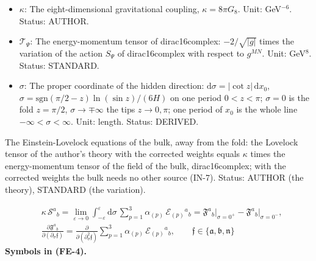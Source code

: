 \documentclass[
  10pt,
]{article}
\begin{document}
\begin{itemize}
  square matrix of the Kronecker deltas \(\delta^{M_a}_{N_b}\) (\(+1\)
  or \(-1\) if the upper indices are an even or odd permutation of the
  lower ones, 0 otherwise). Status: STANDARD.
\item
  \(\kappa\): The eight-dimensional gravitational coupling,
  \(\kappa = 8\pi G_8\). Unit: GeV\(^{-6}\). Status: AUTHOR.
\item
  \(\mathcal{T}_\Psi\): The energy-momentum tensor of dirac16complex:
  \(-2/\sqrt{\lvert g\rvert}\) times the variation of the action
  \(S_\Psi\) of dirac16complex with respect to \(g^{MN}\). Unit:
  GeV\(^8\). Status: STANDARD.
\item
  \(\sigma\): The proper coordinate of the hidden direction:
  \(\mathrm{d}\sigma = \lvert\cot z\rvert\,\mathrm{d}x_0\),
  \(\sigma = \mathrm{sgn}(\pi/2 - z)\ln(\sin z)/(6H)\) on one period
  \(0 < z < \pi\); \(\sigma = 0\) is the fold \(z = \pi/2\),
  \(\sigma \to \mp\infty\) the tips \(z \to 0, \pi\); one period of
  \(x_0\) is the whole line \(-\infty < \sigma < \infty\). Unit: length.
  Status: DERIVED.
\end{itemize}

The Einstein-Lovelock equations of the bulk, away from the fold: the
Lovelock tensor of the author's theory with the corrected weights equals
\(\kappa\) times the energy-momentum tensor of the field of the bulk,
dirac16complex; with the corrected weights the bulk needs no other
source (IN-7). Status: AUTHOR (the theory), STANDARD (the variation).

\[
\begin{aligned}
&\kappa\,\mathcal{S}^a{}_b = \lim_{\varepsilon\to0}\int_{-\varepsilon}^{\varepsilon}\mathrm{d}\sigma\,
 \sum_{p=1}^{3}\alpha_{(p)}\,\mathcal{E}_{(p)}{}^a{}_b
 = \mathfrak{F}^a{}_b\big\vert_{\sigma=0^+} - \mathfrak{F}^a{}_b\big\vert_{\sigma=0^-},\\
&\frac{\partial\mathfrak{F}^a{}_b}{\partial(\partial_\sigma\mathfrak{f})}
 = \frac{\partial}{\partial(\partial_\sigma^2\mathfrak{f})}\sum_{p=1}^{3}\alpha_{(p)}\,\mathcal{E}_{(p)}{}^a{}_b,
 \qquad \mathfrak{f} \in \{\mathfrak{a}, \mathfrak{b}, \mathfrak{n}\}
\end{aligned} \tag{FE-4}
\] \textbf{Symbols in (FE-4).}
\end{document}
